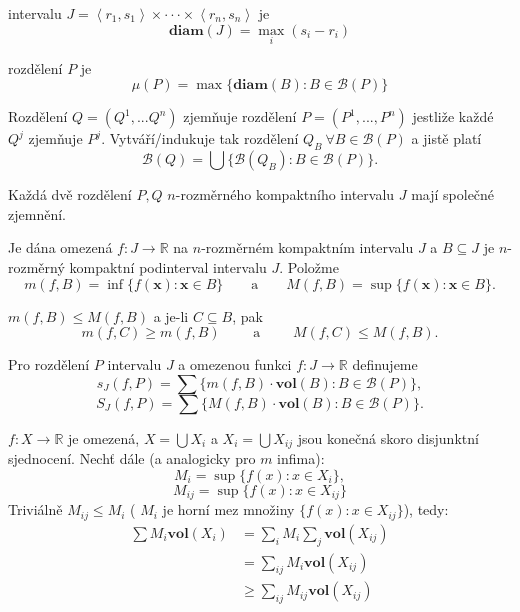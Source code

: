 \documentclass[../main.tex]{subfiles}
\begin{document}
\begin{definitionnodot}
	intervalu $J = \left<r_1,s_1\right> \times \cdot \cdot \cdot \times \left<r_n,s_n\right>$ je
	\[\textbf{diam}(J) = \max_i (s_i - r_i)\]
\end{definitionnodot}

\begin{definitionnodot}[Jemnost]
	rozdělení $P$ je 
	\[\mu(P) = \max \{\textbf{diam}(B) : B \in \mathcal{B}(P)\}\]
\end{definitionnodot}

\begin{definition}[Zjemnění]
	Rozdělení $Q = (Q^1,...Q^n) $ zjemňuje rozdělení $P = (P^1,...,P^n)$ jestliže každé $Q^j$ zjemňuje $P^j$.
	Vytváří/indukuje tak rozdělení $Q_B\ \forall B \in \mathcal{B}(P)$ a jistě platí
	\[\mathcal{B}(Q) = \bigcup \{\mathcal{B}(Q_B) : B \in \mathcal{B}(P)\}.\]
\end{definition}

\begin{observation}
	Každá dvě rozdělení $P,Q$ $n$-rozměrného kompaktního intervalu $J$ mají společné zjemnění.
\end{observation}

\begin{definition}
	Je dána omezená $f: J \rightarrow \mathbb{R}$ na $n$-rozměrném kompaktním intervalu $J$ a $B \subseteq J$ je 
	$n$-rozměrný kompaktní podinterval intervalu $J$. Položme
	\[m(f,B) = \inf\{f(\textbf{x}) : \textbf{x} \in B\} \qquad \text{a} \qquad M(f,B) = \sup\{f(\textbf{x}) : \textbf{x} \in B\}.\]
\end{definition}

\begin{observation}
	$m(f,B) \leq M(f,B)$ a je-li $C \subseteq B$, pak 
	\[m(f,C) \geq m(f,B) \qquad \text{ a } \qquad M(f,C) \leq M(f,B).\]
\end{observation}

\begin{definition}
	Pro rozdělení $P$ intervalu $J$ a omezenou funkci $f : J \rightarrow \mathbb{R}$ definujeme 
	\[s_J(f,P) = \sum \{m(f,B) \cdot \textbf{vol}(B) : B \in \mathcal{B}(P)\},\]
	\[S_J(f,P) = \sum \{M(f,B) \cdot \textbf{vol}(B) : B \in \mathcal{B}(P)\}.\]
\end{definition}

\begin{observation}[obecné]
	$f: X \rightarrow \mathbb{R}$ je omezená, $X = \bigcup X_i$ a $X_i = \bigcup X_{ij}$ jsou konečná skoro disjunktní sjednocení. Nechť dále (a analogicky pro $m$ infima):
	\[M_i = \sup\{f(x) : x \in X_i\},\]
	\[M_{ij} = \sup\{f(x) : x \in X_{ij}\}\]
	Triviálně $M_{ij} \leq M_i$ ( $M_i$ je horní mez množiny $\{f(x) : x \in X_{ij}\}$), tedy:
	$$
	\begin{aligned}
		\sum M_i \textbf{vol}(X_i) &= \sum_i M_i \sum_j \textbf{vol}(X_{ij}) \\
	  &= \sum_{ij}M_i \textbf{vol}(X_{ij}) \\
		&\geq \sum_{ij} M_{ij} \textbf{vol}(X_{ij})
	\end{aligned}
	$$
\end{observation}
\end{document}
